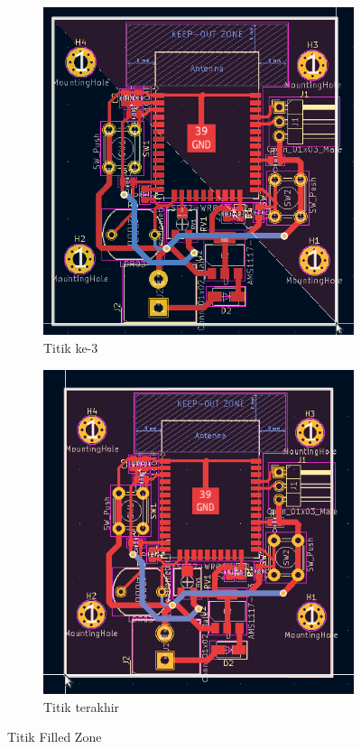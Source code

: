 \documentclass[12pt]{book}
\begin{document}
\begin{itemize}
		\begin{figure}[!ht]
			\centering
			\begin{subfigure}[t]{0.45\textwidth}
				\includegraphics[width=\textwidth]{images/pcb/pcb_22}
				\caption{Titik ke-3}
			\end{subfigure}
			\begin{subfigure}[t]{0.45\textwidth}
				\includegraphics[width=\textwidth]{images/pcb/pcb_23}
				\caption{Titik terakhir}
			\end{subfigure}
			\caption{Titik Filled Zone}
		\end{figure}


\end{itemize}
\end{document}
